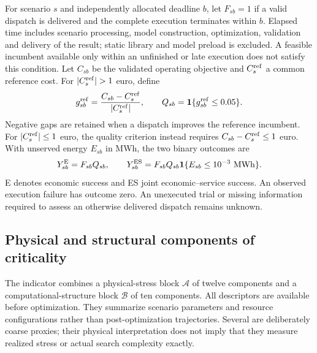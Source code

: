 For scenario $s$ and independently allocated deadline $b$, let $F_{sb}=1$
if a valid dispatch is delivered and the complete execution terminates
within $b$. Elapsed time includes scenario processing, model construction,
optimization, validation and delivery of the result; static library and
model preload is excluded. A feasible incumbent available only within an
unfinished or late execution does not satisfy this condition. Let $C_{sb}$
be the validated operating objective and $C_s^{\rm ref}$ a common reference
cost. For $|C_s^{\rm ref}|>1$ euro, define
\begin{equation}
 g_{sb}^{\rm ref}=\frac{C_{sb}-C_s^{\rm ref}}{|C_s^{\rm ref}|},\qquad
 Q_{sb}=\mathbf{1}\{g_{sb}^{\rm ref}\leq0.05\}.
 \label{eq:economic}
\end{equation}
Negative gaps are retained when a dispatch improves the reference incumbent.
For $|C_s^{\rm ref}|\leq1$ euro, the quality criterion instead requires
$C_{sb}-C_s^{\rm ref}\leq1$ euro. With unserved energy $E_{sb}$ in MWh, the
two binary outcomes are
\begin{equation}
 Y^{\rm E}_{sb}=F_{sb}Q_{sb},\qquad
 Y^{\rm ES}_{sb}=F_{sb}Q_{sb}\mathbf{1}\{E_{sb}\leq10^{-3}\ \mathrm{MWh}\}.
 \label{eq:binary_endpoints}
\end{equation}
E denotes economic success and ES joint economic--service success.
An observed execution failure has outcome zero. An unexecuted trial or
missing information required to assess an otherwise delivered dispatch
remains unknown.

\subsection{Physical and structural components of criticality}
\label{sec:components}
The indicator combines a physical-stress block $\mathcal A$ of twelve
components and a computational-structure block $\mathcal B$ of ten
components. All descriptors are available before optimization. They
summarize scenario parameters and resource configurations rather than
post-optimization trajectories. Several are deliberately coarse proxies;
their physical interpretation does not imply that they measure realized
stress or actual search complexity exactly.

